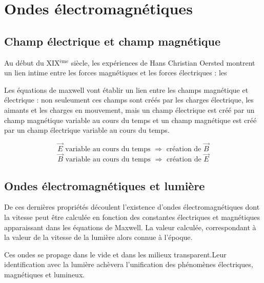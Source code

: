 
\section{Ondes électromagnétiques}

\subsection{Champ électrique et champ magnétique}

Au début du XIX$^\text{ème}$ siècle, les expériences de Hans Christian Oersted montrent un lien intime entre les forces magnétiques et les forces électriques : les 

Les équations de maxwell vont établir un lien entre les champs magnétique et électrique : non seuleument ces champs sont créés par les charges électrique, les aimants et les charges en mouvement, mais un champ électrique est créé par un champ magnétique variable au cours du temps et un champ magnétique est créé par un champ électrique variable au cours du temps.

\[
\overrightarrow{E} \text{ variable au cours du temps } \Rightarrow \text{ création de } \overrightarrow{B}
\]
\[
\overrightarrow{B} \text{ variable au cours du temps } \Rightarrow \text{ création de } \overrightarrow{E}
\]


\subsection{Ondes électromagnétiques et lumière}

De ces dernières propriétés découlent l'existence d'ondes électromagnétiques dont la vitesse peut être calculée en fonction des constantes électriques et magnétiques apparaissant dans les équations de Maxwell. La valeur calculée, correspondant à la valeur de la vitesse de la lumière alors connue à l'époque.

Ces ondes se propage dans le vide et dans les milieux transparent.Leur identification avec la lumière achèvera l'unification des phénomènes électriques, magnétiques et lumineux.

